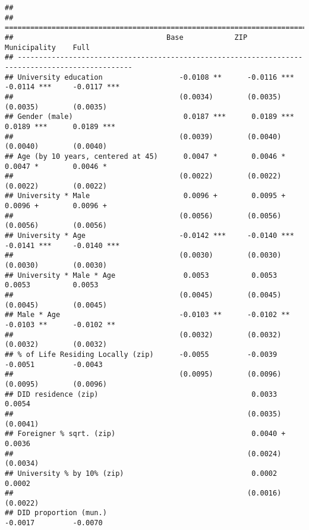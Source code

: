 \documentclass[
]{article}
\begin{document}
\begin{verbatim}
## 
## =================================================================================================
##                                    Base            ZIP             Municipality    Full          
## -------------------------------------------------------------------------------------------------
## University education                  -0.0108 **      -0.0116 ***     -0.0114 ***     -0.0117 ***
##                                       (0.0034)        (0.0035)        (0.0035)        (0.0035)   
## Gender (male)                          0.0187 ***      0.0189 ***      0.0189 ***      0.0189 ***
##                                       (0.0039)        (0.0040)        (0.0040)        (0.0040)   
## Age (by 10 years, centered at 45)      0.0047 *        0.0046 *        0.0047 *        0.0046 *  
##                                       (0.0022)        (0.0022)        (0.0022)        (0.0022)   
## University * Male                      0.0096 +        0.0095 +        0.0096 +        0.0096 +  
##                                       (0.0056)        (0.0056)        (0.0056)        (0.0056)   
## University * Age                      -0.0142 ***     -0.0140 ***     -0.0141 ***     -0.0140 ***
##                                       (0.0030)        (0.0030)        (0.0030)        (0.0030)   
## University * Male * Age                0.0053          0.0053          0.0053          0.0053    
##                                       (0.0045)        (0.0045)        (0.0045)        (0.0045)   
## Male * Age                            -0.0103 **      -0.0102 **      -0.0103 **      -0.0102 ** 
##                                       (0.0032)        (0.0032)        (0.0032)        (0.0032)   
## % of Life Residing Locally (zip)      -0.0055         -0.0039         -0.0051         -0.0043    
##                                       (0.0095)        (0.0096)        (0.0095)        (0.0096)   
## DID residence (zip)                                    0.0033                          0.0054    
##                                                       (0.0035)                        (0.0041)   
## Foreigner % sqrt. (zip)                                0.0040 +                        0.0036    
##                                                       (0.0024)                        (0.0034)   
## University % by 10% (zip)                              0.0002                          0.0002    
##                                                       (0.0016)                        (0.0022)   
## DID proportion (mun.)                                                 -0.0017         -0.0070    

\end{verbatim}
\end{document}
